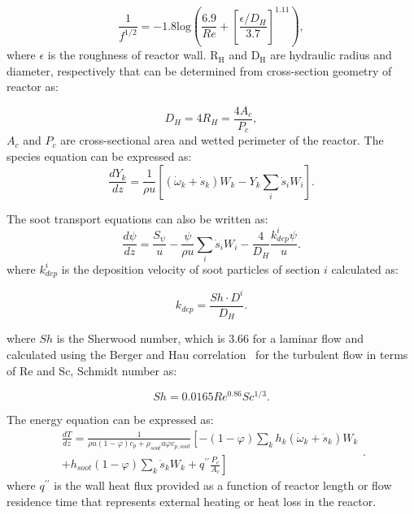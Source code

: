 \begin{equation}
	\frac{1}{f^{1/2}} = -1.8 \mathrm{log}
	\left(
		\frac{6.9}{Re}+
		\left[ \frac{\epsilon/D_H}{3.7} \right]^{1.11}
	\right)
	\label{eqn:fpfr},
\end{equation}
\noindent where $\epsilon$ is the roughness of reactor wall.
$\mathrm{R_H}$ and $\mathrm{D_H}$ are hydraulic radius and diameter, respectively that can be determined from cross-section geometry of reactor as:

\begin{equation}
	D_H = 4 R_H = \frac{4 A_c}{P_c}
	\label{eqn:RDHpfr},
\end{equation}
\noindent $A_c$ and $P_c$ are cross-sectional area and wetted perimeter of the reactor.
The species equation can be expressed as:
\begin{equation}
	\frac{d Y_k}{d z}=\frac{1}{\rho u}\left[\left(\dot{\omega}_k+\dot{s}_k\right) W_k-Y_k \sum_i \dot{s}_i W_i\right]
	\label{eqn:speciespfr}.
\end{equation}

The soot transport equations can also be written as:
\begin{equation}
	\frac{d \psi}{d z}=
	\frac{S_{\psi}}{u}
	-\frac{\psi}{\rho u}\sum_i \dot{s}_i W_i
	-\frac{4}{D_H}\frac{k^i_{dep}\psi}{u}
	\label{eqn:sootpfr}.
\end{equation}
\noindent where $k^i_{dep}$ is the deposition velocity of soot particles of section $i$ calculated as:

\begin{equation}
	k_{dep}=
	\frac{Sh\cdot D^i}{D_H}
	\label{eqn:kdep}.
\end{equation}

\noindent where $Sh$ is the Sherwood number, which is 3.66 for a laminar flow and calculated using the Berger and Hau correlation~\citep{berger1977mass} for the turbulent flow in terms of Re and Sc, Schmidt number as:

\begin{equation}
	Sh=
	0.0165Re^{0.86} Sc^{1/3}
	\label{eqn:shdep}.
\end{equation}

The energy equation can be expressed as:
\begin{equation}
	\begin{split}
		\frac{d T}{d z}=
		\frac{1}{\rho u (1-\varphi) c_p+\rho_{soot} u \varphi 	c_{p,soot}}
		\left[
			-(1-\varphi)\sum_k h_k
			\left(
			\dot{\omega}_k+\dot{s}_k
			\right) W_k
		\right. \\
		\left.
			+h_{soot}(1-\varphi)\sum_k \dot{s}_k W_k
			+q^{\prime \prime}\frac{P_c}{A_c}
		\right]
	\end{split}
	\label{eqn:energypfr}.
\end{equation}
\noindent where $q^{\prime \prime}$ is the wall heat flux provided as a function of reactor length or flow residence time that represents external heating or heat loss in the reactor.




